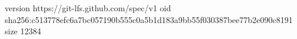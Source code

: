 version https://git-lfs.github.com/spec/v1
oid sha256:c513778efc6a7bc057190b555c0a5b1d183a9bb55f030387bee77b2e090c8191
size 12384
